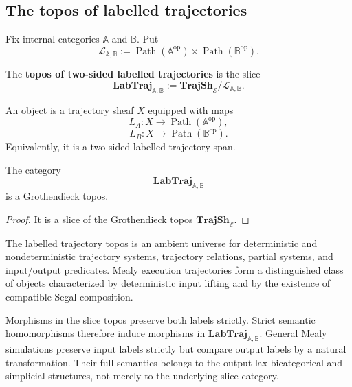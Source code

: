 \subsection{The topos of labelled trajectories}
\label{subsec:topos-labelled-trajectories}

Fix internal categories \(\mathbb A\) and \(\mathbb B\). Put
\[
    \mathscr L_{\mathbb A,\mathbb B}
    :=
    \operatorname{Path}(\mathbb A^{\mathrm{op}})
    \times
    \operatorname{Path}(\mathbb B^{\mathrm{op}}).
\]

\begin{definition}
\label{def:labelled-trajectory-topos}
The \textbf{topos of two-sided labelled trajectories} is the slice
\[
    \mathbf{LabTraj}_{\mathbb A,\mathbb B}
    :=
    \mathbf{TrajSh}_{\mathcal E}
    /
    \mathscr L_{\mathbb A,\mathbb B}.
\]
\end{definition}

An object is a trajectory sheaf \(X\) equipped with maps
\[
    L_A:X\to\operatorname{Path}(\mathbb A^{\mathrm{op}}),
\]
\[
    L_B:X\to\operatorname{Path}(\mathbb B^{\mathrm{op}}).
\]
Equivalently, it is a two-sided labelled trajectory span.

\begin{corollary}
\label{cor:labelled-trajectory-topos}
The category
\[
    \mathbf{LabTraj}_{\mathbb A,\mathbb B}
\]
is a Grothendieck topos.
\end{corollary}

\begin{proof}
It is a slice of the Grothendieck topos
\(\mathbf{TrajSh}_{\mathcal E}\).
\end{proof}

The labelled trajectory topos is an ambient universe for deterministic and
nondeterministic trajectory systems, trajectory relations, partial systems,
and input/output predicates. Mealy execution trajectories form a
distinguished class of objects characterized by deterministic input lifting
and by the existence of compatible Segal composition.

\begin{remark}
\label{rem:strict-lax-label-comparison}
Morphisms in the slice topos preserve both labels strictly. Strict semantic
homomorphisms therefore induce morphisms in
\(\mathbf{LabTraj}_{\mathbb A,\mathbb B}\).
General Mealy simulations preserve input labels strictly but compare output
labels by a natural transformation. Their full semantics belongs to the
output-lax bicategorical and simplicial structures, not merely to the
underlying slice category.
\end{remark}

